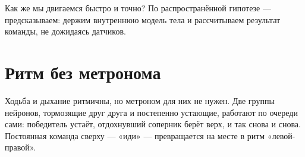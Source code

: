 Как же мы двигаемся быстро и точно? По распространённой гипотезе --- предсказываем: держим внутреннюю модель тела и рассчитываем результат команды, не дожидаясь датчиков.

\section*{Ритм без метронома}

Ходьба и дыхание ритмичны, но метроном для них не нужен. Две группы нейронов, тормозящие друг друга и постепенно устающие, работают по очереди сами: победитель устаёт, отдохнувший соперник берёт верх, и так снова и снова. Постоянная команда сверху --- «иди» --- превращается на месте в ритм «левой-правой».


